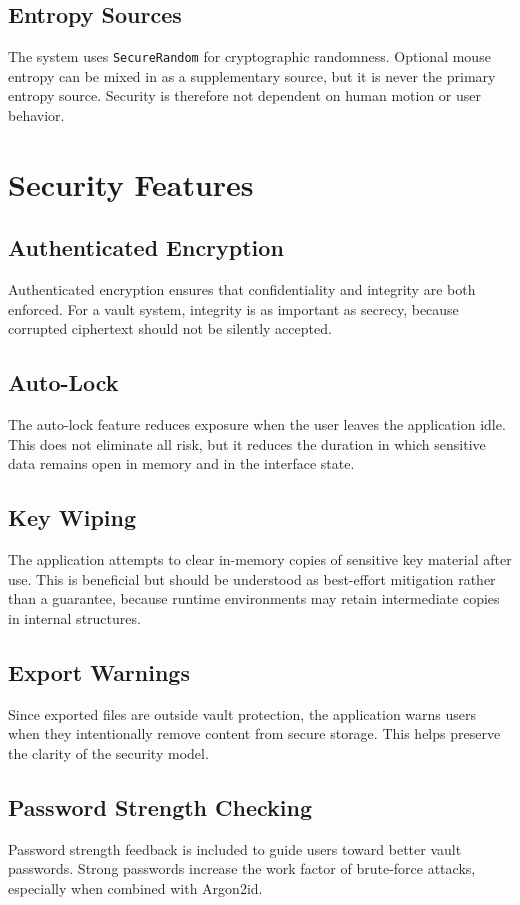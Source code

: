 \documentclass[12pt,a4paper]{report}
\begin{document}
\section{Entropy Sources}
The system uses \texttt{SecureRandom} for cryptographic randomness. Optional mouse entropy can be mixed in as a supplementary source, but it is never the primary entropy source. Security is therefore not dependent on human motion or user behavior.

\chapter{Security Features}
\section{Authenticated Encryption}
Authenticated encryption ensures that confidentiality and integrity are both enforced. For a vault system, integrity is as important as secrecy, because corrupted ciphertext should not be silently accepted.

\section{Auto-Lock}
The auto-lock feature reduces exposure when the user leaves the application idle. This does not eliminate all risk, but it reduces the duration in which sensitive data remains open in memory and in the interface state.

\section{Key Wiping}
The application attempts to clear in-memory copies of sensitive key material after use. This is beneficial but should be understood as best-effort mitigation rather than a guarantee, because runtime environments may retain intermediate copies in internal structures.

\section{Export Warnings}
Since exported files are outside vault protection, the application warns users when they intentionally remove content from secure storage. This helps preserve the clarity of the security model.

\section{Password Strength Checking}
Password strength feedback is included to guide users toward better vault passwords. Strong passwords increase the work factor of brute-force attacks, especially when combined with Argon2id.
\end{document}
